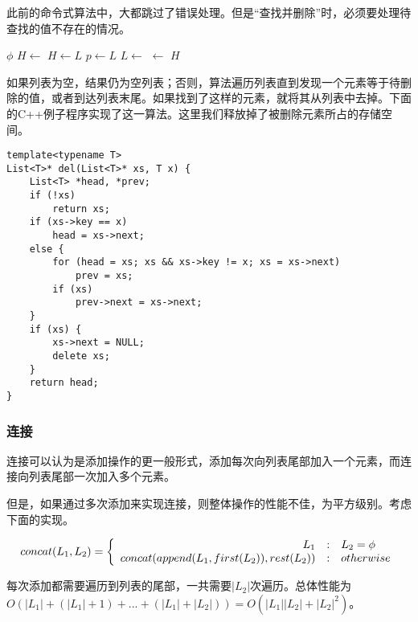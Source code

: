 \documentclass[UTF8]{article}
\begin{document}
此前的命令式算法中，大都跳过了错误处理。但是“查找并删除”时，必须要处理待查找的值不存在的情况。

\begin{algorithmic}[1]
   
    \State \Return $\phi$
  \EndIf
    \State $H \gets$ 
  \Else
    \State $H \gets L$
     
      \State $p \gets L$
      \State $L \gets$ 
    \EndWhile
     
      \State {} $\gets$ 
    \EndIf
  \EndIf
  \State \Return $H$
\EndFunction
\end{algorithmic}

如果列表为空，结果仍为空列表；否则，算法遍历列表直到发现一个元素等于待删除的值，或者到达列表末尾。如果找到了这样的元素，就将其从列表中去掉。下面的C++例子程序实现了这一算法。这里我们释放掉了被删除元素所占的存储空间。

\lstset{language=C++}
\begin{lstlisting}
template<typename T>
List<T>* del(List<T>* xs, T x) {
    List<T> *head, *prev;
    if (!xs)
        return xs;
    if (xs->key == x)
        head = xs->next;
    else {
        for (head = xs; xs && xs->key != x; xs = xs->next)
            prev = xs;
        if (xs)
            prev->next = xs->next;
    }
    if (xs) {
        xs->next = NULL;
        delete xs;
    }
    return head;
}
\end{lstlisting}

\subsubsection{连接}
\label{concat}

连接可以认为是添加操作的更一般形式，添加每次向列表尾部加入一个元素，而连接向列表尾部一次加入多个元素。

但是，如果通过多次添加来实现连接，则整体操作的性能不佳，为平方级别。考虑下面的实现。

\[
concat(L_1, L_2) = \left \{
  \begin{array}
  {r@{\quad:\quad}l}
  L_1 & L_2 = \phi \\
  concat(append(L_1, first(L_2)), rest(L_2)) & otherwise
  \end{array}
\right.
\]

每次添加都需要遍历到列表的尾部，一共需要$|L_2|$次遍历。总体性能为$O(|L_1| + (|L_1| + 1) + ... + (|L_1| + |L_2|)) = O(|L_1||L_2| + |L_2|^2)$。
\end{document}
